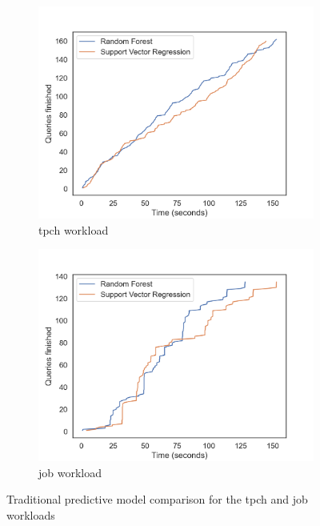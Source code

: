 \begin{figure}[H]
  \begin{subfigure}[t]{0.5\textwidth}
    \includegraphics[width=\textwidth]{img/performance_evaluation/tpch_models_comparison.png}
    \caption{\gls{tpch} workload}
  \end{subfigure}\hfill
  \begin{subfigure}[t]{0.5\textwidth}
    \includegraphics[width=\textwidth]{img/performance_evaluation/job_models_comparison.png}
    \caption{\gls{job} workload}
  \end{subfigure}
  \caption{Traditional predictive model comparison for the \gls{tpch} and \gls{job} workloads}
  \label{fig:model_comparison}
\end{figure}


